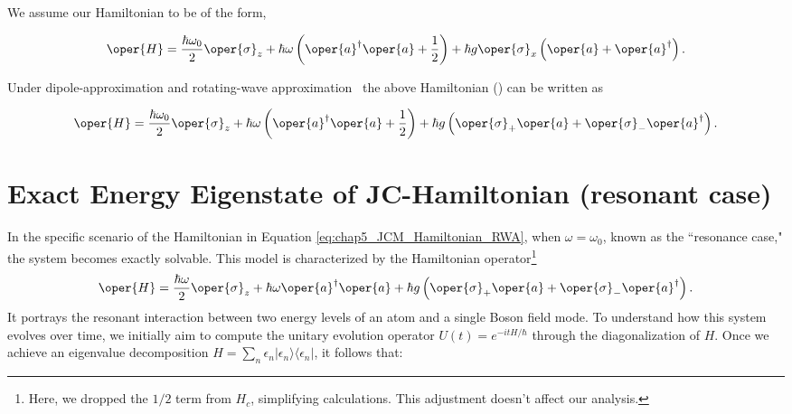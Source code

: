 We assume our Hamiltonian to be of the form,

\begin{mdframed}
\begin{eqnarray}
        \label{eq:chap5_JCM_Hamiltonian}
        \oper{H} = \frac{\hbar \omega_0}{2} \oper{\sigma}_z + \hbar \omega \left(\oper{a}^\dagger \oper{a} + \frac{1}{2}\right) 
        + \hbar g \oper{\sigma}_x\left(\oper{a} + \oper{a}^\dagger\right). 
\end{eqnarray}
\end{mdframed}
Under dipole-approximation and rotating-wave approximation~\cite[Chap 2]{Bina_JC_tutorial} the above Hamiltonian () can be written as
\begin{mdframed}
\begin{equation}
        \label{eq:chap5_JCM_Hamiltonian_RWA}
        \oper{H} = \frac{\hbar \omega_0}{2} \oper{\sigma}_z + \hbar \omega \left(\oper{a}^\dagger \oper{a} + \frac{1}{2}\right) 
        + \hbar g \left(\oper{\sigma}_+ \oper{a} + \oper{\sigma}_- \oper{a}^\dagger\right).
\end{equation}
\end{mdframed}

\section[Exact Energy Eigenstate of JC-Hamiltonian]{Exact Energy Eigenstate of JC-Hamiltonian (resonant case)}

In the specific scenario of the Hamiltonian in Equation \ref{eq:chap5_JCM_Hamiltonian_RWA}, when 
\(\omega  = \omega_0\), known as the 
``resonance case," the system becomes exactly solvable.
This model is characterized by the Hamiltonian operator\footnote{Here, we dropped the \(1/2\) term from \(H_c\), 
simplifying calculations. This adjustment doesn't affect our analysis.}
\begin{equation}
        \label{eq:chap5_JCM_Hamiltonian_resonance}
        \oper{H} = \frac{\hbar\omega}{2} \oper{\sigma}_z + \hbar \omega \oper{a}^\dagger \oper{a}
        + \hbar g \left(\oper{\sigma}_+ \oper{a} + \oper{\sigma}_- \oper{a}^\dagger\right). 
\end{equation}
It portrays the resonant interaction between two energy levels of an atom and a single Boson field mode.
To understand how this system evolves over time, we initially aim to compute the unitary evolution operator 
$U(t) = e^{-i t H/\hbar}$ through the diagonalization of $H$. Once we achieve an eigenvalue decomposition 
$H = \sum_n \epsilon_n \lvert \epsilon_n \rangle \langle \epsilon_n \rvert$, it follows that:

